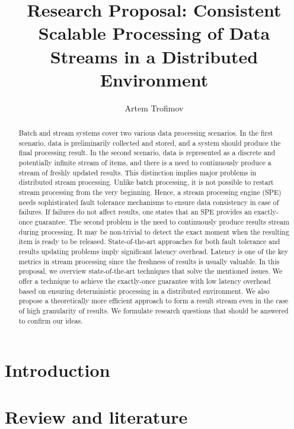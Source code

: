 \documentclass[runningheads]{llncs}
\begin{document}
\title {Research Proposal: Consistent Scalable Processing of Data Streams in  a Distributed Environment
}
\author{Artem Trofimov}

\maketitle

\begin{abstract}
Batch and stream systems cover two various data processing scenarios. In the first scenario, data is preliminarily collected and stored, and a system should produce the final processing result. In the second scenario, data is represented as a discrete and potentially infinite stream of items, and there is a need to continuously produce a stream of freshly updated results. This distinction implies major problems in distributed stream processing. Unlike batch processing, it is not possible to restart stream processing from the very beginning. Hence, a stream processing engine (SPE) needs sophisticated fault tolerance mechanisms to ensure data consistency in case of failures. If failures do not affect results, one states that an SPE provides an exactly-once guarantee. The second problem is the need to continuously produce results stream during processing. It may be non-trivial to detect the exact moment when the resulting item is ready to be released. State-of-the-art approaches for both fault tolerance and results updating problems imply significant latency overhead. Latency is one of the key metrics in stream processing since the freshness of results is usually valuable. In this proposal, we overview state-of-the-art techniques that solve the mentioned issues. We offer a technique to achieve the exactly-once guarantee with low latency overhead based on ensuring deterministic processing in a distributed environment. We also propose a theoretically more efficient approach to form a result stream even in the case of high granularity of results. We formulate research questions that should be answered to confirm our ideas. 
\end{abstract}

\section {Introduction}

\section {Review and literature}

\end{document}
